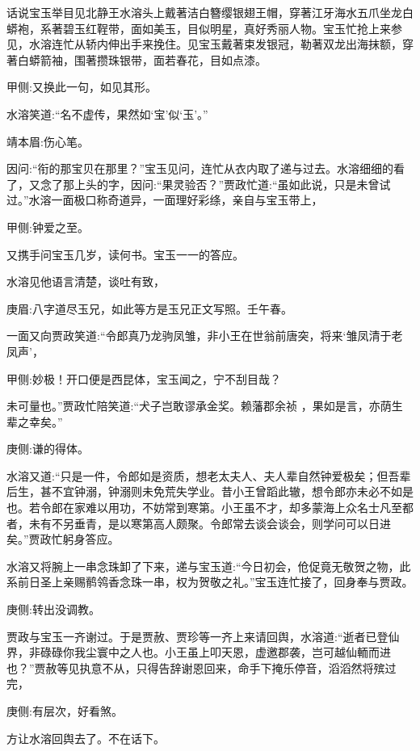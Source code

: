 \begin{parag}
    话说宝玉举目见北静王水溶头上戴著洁白簪缨银翅王帽，穿著江牙海水五爪坐龙白蟒袍，系著碧玉红鞓带，面如美玉，目似明星，真好秀丽人物。宝玉忙抢上来参见，水溶连忙从轿内伸出手来挽住。见宝玉戴著束发银冠，勒著双龙出海抹额，穿著白蟒箭袖，围著攒珠银带，面若春花，目如点漆。\begin{note}甲侧:又换此一句，如见其形。\end{note}水溶笑道:“名不虚传，果然如‘宝’似‘玉’。”\begin{note}靖本眉:伤心笔。\end{note}因问:“衔的那宝贝在那里？”宝玉见问，连忙从衣内取了递与过去。水溶细细的看了，又念了那上头的字，因问:“果灵验否？”贾政忙道:“虽如此说，只是未曾试过。”水溶一面极口称奇道异，一面理好彩绦，亲自与宝玉带上，\begin{note}甲侧:钟爱之至。\end{note}又携手问宝玉几岁，读何书。宝玉一一的答应。
\end{parag}


\begin{parag}
    水溶见他语言清楚，谈吐有致，\begin{note}庚眉:八字道尽玉兄，如此等方是玉兄正文写照。壬午春。\end{note}一面又向贾政笑道:“令郎真乃龙驹凤雏，非小王在世翁前唐突，将来‘雏凤清于老凤声’，\begin{note}甲侧:妙极！开口便是西昆体，宝玉闻之，宁不刮目哉？\end{note}未可量也。”贾政忙陪笑道:“犬子岂敢谬承金奖。赖藩郡余祯 ，果如是言，亦荫生辈之幸矣。”\begin{note}庚侧:谦的得体。\end{note}水溶又道:“只是一件，令郎如是资质，想老太夫人、夫人辈自然钟爱极矣；但吾辈后生，甚不宜钟溺，钟溺则未免荒失学业。昔小王曾蹈此辙，想令郎亦未必不如是也。若令郎在家难以用功，不妨常到寒第。小王虽不才，却多蒙海上众名士凡至都者，未有不另垂青，是以寒第高人颇聚。令郎常去谈会谈会，则学问可以日进矣。”贾政忙躬身答应。
\end{parag}


\begin{parag}
    水溶又将腕上一串念珠卸了下来，递与宝玉道:“今日初会，伧促竟无敬贺之物，此系前日圣上亲赐鹡鸰香念珠一串，权为贺敬之礼。”宝玉连忙接了，回身奉与贾政。\begin{note}庚侧:转出没调教。\end{note}贾政与宝玉一齐谢过。于是贾赦、贾珍等一齐上来请回舆，水溶道:“逝者已登仙界，非碌碌你我尘寰中之人也。小王虽上叩天恩，虚邀郡袭，岂可越仙輀而进也？”贾赦等见执意不从，只得告辞谢恩回来，命手下掩乐停音，滔滔然将殡过完，\begin{note}庚侧:有层次，好看煞。\end{note}方让水溶回舆去了。不在话下。
\end{parag}


